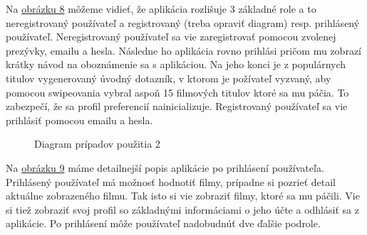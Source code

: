 Na \hyperref[usecase1]{obrázku 8} môžeme vidieť, že aplikácia rozlišuje 3 základné role a to neregistrovaný používateľ a registrovaný (treba opraviť diagram) resp. prihlásený používateľ. Neregistrovaný používateľ sa vie zaregistrovať pomocou zvolenej prezývky, emailu a hesla. Následne ho aplikácia rovno prihlási pričom mu zobrazí krátky návod na oboznámenie sa s aplikáciou. Na jeho konci je z populárnych titulov vygenerovaný úvodný dotazník, v ktorom je požívateľ vyzvaný, aby pomocou swipeovania vybral aspoň 15 filmových titulov ktoré sa mu páčia. To zabezpečí, že sa profil preferencií nainicializuje. Registrovaný používateľ sa vie prihlásiť pomocou emailu a hesla.
\pagebreak

\begin{figure}[hbt!]
  \centering  
  \def\stackalignment{c}
           {\scriptsize}
	\caption{Diagram prípadov použitia 2}  
  \label{usecase2}
\end{figure}
Na \hyperref[usecase2]{obrázku 9} máme detailnejší popis aplikácie po prihlásení používateľa. Prihlásený používateľ má možnosť hodnotiť filmy, prípadne si pozrieť detail aktuálne zobrazeného filmu. Tak isto si vie zobraziť filmy, ktoré sa mu páčili. Vie si tiež zobraziť svoj profil so základnými informáciami o jeho účte a odhlásiť sa z aplikácie. Po prihlásení môže používateľ nadobudnúť dve ďalšie podrole.

